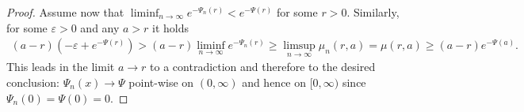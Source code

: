 \documentclass[10pt,a4paper]{amsart}
\begin{document}
\begin{proof}
     Assume now that  $\liminf_{n\rightarrow\infty}e^{-\Psi_{n}(r)}<e^{-\Psi(r)}$ for some $r > 0$. Similarly, for some $\varepsilon>0$ and any $a>r$ it holds
  \begin{align*}
      (a-r)(-\varepsilon + e^{-\Psi(r)})
      > (a-r) \liminf_{n\rightarrow\infty} e^{-\Psi_n(r)} 
      \geq 
      \limsup_{n\rightarrow\infty}\mu_{n}(r,a)
      =\mu(r,a) 
      \geq (a-r)e^{-\Psi(a)} .
      \end{align*}    
This leads in the limit $a \to r$ to a contradiction and therefore to the desired conclusion: $\Psi_n(x) \to \Psi$ point-wise on $(0,\infty)$ and hence on $[0,\infty)$ since $\Psi_n(0)=\Psi(0)=0$.









\end{proof}
\end{document}
